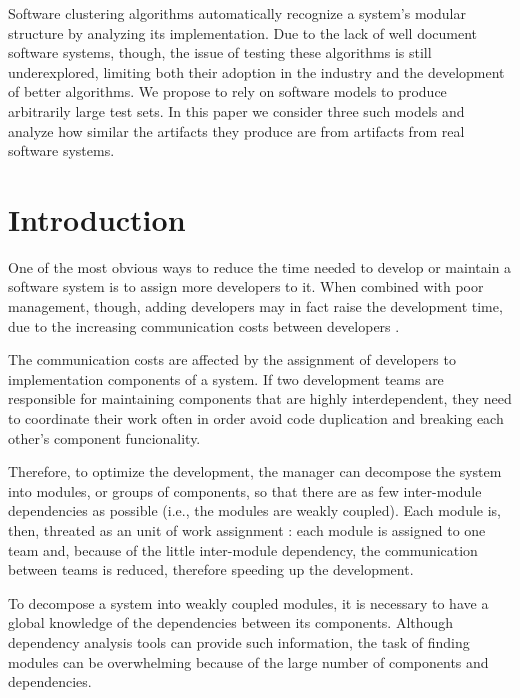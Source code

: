 Software clustering algorithms automatically recognize a system's modular
structure by analyzing its implementation.  Due to the lack of well document
software systems, though, the issue of testing these algorithms is still
underexplored, limiting both their adoption in the industry and the development
of better algorithms.  We propose to rely on software models to produce
arbitrarily large test sets. In this paper we consider three such models and
analyze how similar the artifacts they produce are from artifacts from real
software systems.

\section{Introduction} \label{sec:introduction}

%

One of the most obvious ways to reduce the time needed to develop or maintain a
software system is to assign more developers to it. When combined with poor
management, though, adding developers may in fact raise the development time,
due to the increasing communication costs between developers \cite{Brooks1995}.

The communication costs are affected by the assignment of developers to
implementation components of a system.
If two development teams are responsible for maintaining components that are
highly interdependent, they need to coordinate their work often in order avoid
code duplication and breaking each other's component funcionality.

Therefore, to optimize the development, the manager can decompose the system
into modules, or groups of components, so that there are as few inter-module
dependencies as possible (i.e., the modules are weakly coupled). Each module is,
then, threated as an unit of work assignment \cite{Parnas1972}: each module is
assigned to one team and, because of the little inter-module dependency, the
communication between teams is reduced, therefore speeding up the development.

To decompose a system into weakly coupled modules, it is necessary to have a
global knowledge of the dependencies between its components. Although dependency
analysis tools can provide such information, the task of finding modules can be
overwhelming because of the large number of components and dependencies.

